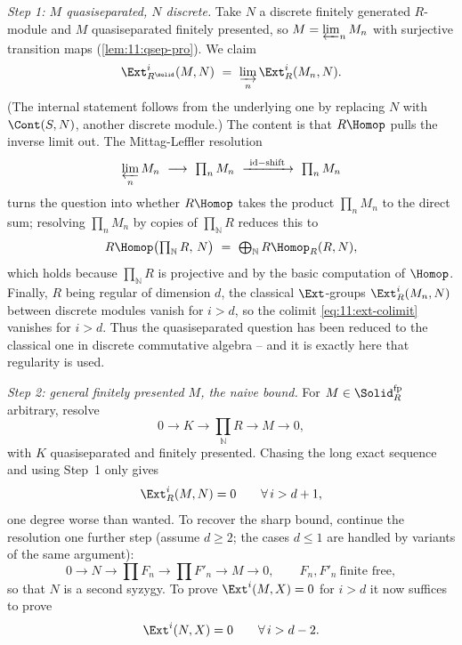 \emph{Step 1: $M$ quasiseparated, $N$ discrete.} Take $N$ a discrete finitely
generated $R$-module and $M$ quasiseparated finitely presented, so
$M=\varprojlim_{n}M_{n}$ with surjective transition maps
(\cref{lem:11:qsep-pro}). We claim
\begin{equation}
\label{eq:11:ext-colimit}
\Ext^{i}_{R^{\solid}}(M,N)\ =\ \varinjlim_{n}\Ext^{i}_{R}(M_{n},N).
\end{equation}
(The internal statement follows from the underlying one by replacing $N$ with
$\Cont(S,N)$, another discrete module.) The content is that $R\Homop$ pulls the
inverse limit out. The Mittag-Leffler resolution
\begin{equation*}
\varprojlim_{n}M_{n}\ \longrightarrow\ \textstyle\prod_{n}M_{n}\
\xrightarrow{\ \mathrm{id}-\mathrm{shift}\ }\ \textstyle\prod_{n}M_{n}
\end{equation*}
turns the question into whether $R\Homop$ takes the product $\prod_{n}M_{n}$ to
the direct sum; resolving $\prod_{n}M_{n}$ by copies of $\prod_{\mathbb{N}}R$
reduces this to
\begin{equation*}
R\Homop\bigl(\textstyle\prod_{\mathbb{N}}R,\,N\bigr)\ =\ \bigoplus_{\mathbb{N}}
R\Homop_{R}(R,N),
\end{equation*}
which holds because $\prod_{\mathbb{N}}R$ is projective and by the basic
computation of $\Homop$. Finally, $R$ being regular of dimension $d$, the
classical $\Ext$-groups $\Ext^{i}_{R}(M_{n},N)$ between discrete modules vanish
for $i>d$, so the colimit \eqref{eq:11:ext-colimit} vanishes for $i>d$. Thus
the quasiseparated question has been reduced to the classical one in discrete
commutative algebra -- and it is exactly here that regularity is used.

\emph{Step 2: general finitely presented $M$, the naive bound.} For
$M\in\Solid_{R}^{\mathrm{fp}}$ arbitrary, resolve
\begin{equation*}
0\to K\to\textstyle\prod_{\mathbb{N}}R\to M\to 0,
\end{equation*}
with $K$ quasiseparated and finitely presented. Chasing the long exact
sequence and using Step~1 only gives
\begin{equation*}
\Ext^{i}_{R}(M,N)=0\qquad\forall\,i>d+1,
\end{equation*}
one degree worse than wanted. To recover the sharp bound, continue the
resolution one further step (assume $d\ge 2$; the cases $d\le 1$ are handled by
variants of the same argument):
\begin{equation*}
0\to N\to\textstyle\prod F_{n}\to\textstyle\prod F'_{n}\to M\to 0,
\qquad F_{n},F'_{n}\ \text{finite free},
\end{equation*}
so that $N$ is a second syzygy. To prove $\Ext^{i}(M,X)=0$ for $i>d$ it now
suffices to prove
\begin{equation}
\label{eq:11:suffices-syzygy}
\Ext^{i}(N,X)=0\qquad\forall\,i>d-2.
\end{equation}

